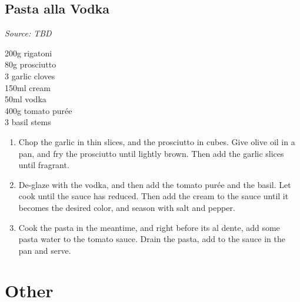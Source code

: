 \documentclass{report}
\begin{document}
\section{Pasta alla Vodka}
\textit{Source: TBD}\\
\begin{minipage}[t]{0.21\textwidth} \vspace{0pt}
200g rigatoni\\
80g prosciutto\\
3 garlic cloves\\
150ml cream\\
50ml vodka\\
400g tomato purée\\
3 basil stems
\end{minipage}
\hfill
\begin{minipage}[t]{0.78\textwidth} \vspace{0pt}
	\begin{enumerate}
		\item Chop the garlic in thin slices, and the prosciutto in cubes. Give olive oil in a pan, and fry the prosciutto until lightly brown. Then add the garlic slices until fragrant.
		\item De-glaze with the vodka, and then add the tomato purée and the basil. Let cook until the sauce has reduced. Then add the cream to the sauce until it becomes the desired color, and season with salt and pepper.
		\item Cook the pasta in the meantime, and right before its al dente, add some pasta water to the tomato sauce. Drain the pasta, add to the sauce in the pan and serve.
	\end{enumerate}	
\end{minipage}

\chapter{Other}
\end{document}
